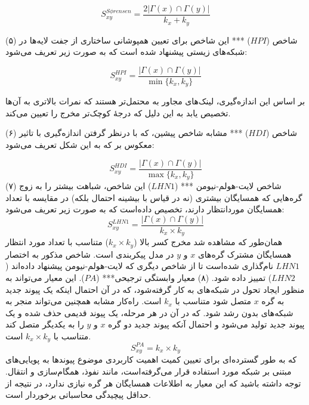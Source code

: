 \begin{equation}
S_{xy}^{S\phi rensen}=\frac{2|\Gamma(x)\cap\Gamma(y)|}{k_{x}+k_{y}}
\end{equation}

(۵) شاخص \HubPromoted ($HPI$) *** این شاخص برای تعیین همپوشانی ساختاری از جفت‌ لایه‌‌ها در شبکه‌های زیستی پیشنهاد شده است که به صورت زیر تعریف می‌شود: 

\begin{equation}
S_{xy}^{HPI}=\frac{|\Gamma(x)\cap\Gamma(y)|}{\min\{ k_{x},k_{y} \}}
\end{equation}

بر اساس این اندازه‌گیری، لینک‌های مجاور به \hubs محتمل‌تر هستند که نمرات بالاتری به آن‌ها تخصیص یابد به این دلیل که درجهٔ کوچک‌تر مخرج را تعیین می‌کند.

(۶) شاخص \HubDepressed ($HDI$) *** مشابه شاخص پیشین، که با درنظر گرفتن اندازه‌گیری با تاثیر معکوس بر \hubs که به این شکل تعریف می‌شود:

\begin{equation}
S_{xy}^{HDI}=\frac{|\Gamma(x)\cap\Gamma(y)|}{\max\{ k_{x},k_{y} \}}
\end{equation}
 (۷) شاخص لایت-هولم-نیومن *** ($LHN1$) این شاخص، شباهت بیشتر را به زوج گره‌هایی که همسایگان بیشتری (نه در قیاس با بیشینه احتمال بلکه) در مقایسه با تعداد همسایگان موردانتظار دارند، تخصیص داده‌است که به صورت زیر تعریف می‌شود:
 \begin{equation}
S_{xy}^{LHN1}=\frac{|\Gamma(x)\cap\Gamma(y)|}{k_{x}\times k_{y}}
\end{equation}
همان‌طور که مشاهده شد مخرج کسر بالا ($k_{x} \times k_{y}$) متناسب با تعداد مورد انتظار همسایگان مشترک گره‌های $x$ و $y$ در مدل پیکربندی است. شاخص مذکور به اختصار $LHN1$ نام‌گذاری شده‌است تا از شاخص دیگری که لایت-هولم-نیومن پیشنهاد داده‌اند ($LHN2$) تمییز داده شود.
(۸) معیار وابستگی ترجیحی*** ($PA$). این معیار می‌تواند به منظور ایجاد تحول در شبکه‌های \scalefree به کار گرفته‌شود، که در آن احتمال اینکه یک پیوند جدید به گره $x$ متصل شود متناسب با $k_{x}$ است. راه‌کار مشابه همچنین می‌تواند منجر به شبکه‌های \scalefree بدون رشد شود. که در آن در هر مرحله، یک پیوند قدیمی حذف شده‌ و یک پیوند جدید تولید می‌شود و احتمال آنکه پیوند جدید دو گره $x$ و $y$ را به یکدیگر متصل کند متناسب با $k_{x} \times k_{y}$ است.
\begin{equation}
S_{xy}^{PA}=k_{x}\times k_{y}
\end{equation}
که به طور گسترده‌ای برای تعیین کمیت اهمیت کاربردی موضوع پیوندها به پویایی‌های مبتنی بر شبکه مورد استفاده قرار می‌گرفته‌است، مانند نفوذ، همگام‌سازی و انتقال. توجه داشته باشید که این معیار به اطلاعات همسایگان هر گره نیازی ندارد، در نتیجه از حداقل پیچیدگی محاسباتی برخوردار است.

